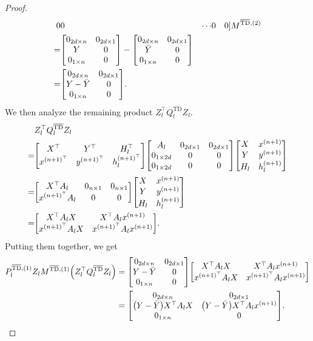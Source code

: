 \documentclass{article}
\newcommand{\bartd}{\overline{\text{TD}}}
\begin{document}
\begin{proof}
\begin{align}
                0 & 0 & \cdots & 0 & 0] M^{\bartd, (2)}\\
        =& \mqty[0_{2d\times n} & 0_{2d \times 1}\\
                 Y & 0\\
                 0_{1\times n} & 0] 
        - \mqty[0_{2d\times n} & 0_{2d \times 1}\\
                \bar{Y} & 0\\
                0_{1\times n} & 0]\\
        =& \mqty[0_{2d\times n} & 0_{2d \times 1}\\
                 Y - \bar{Y} & 0\\
                 0_{1\times n} & 0].
    \end{align}
    We then analyze the remaining product $Z_l^\top Q_l^{\bartd} Z_l$.
    \begin{align}
        & Z_l^\top Q_l^{\bartd} Z_l\\
        =& \mqty[X^\top & Y^\top & H_l^\top\\
                 x^{(n+1)^\top} & y^{(n+1)^\top} &  h_l^{(n+1)^\top}]
           \mqty[A_l & 0_{2d\times 1} & 0_{2d\times 1}\\
                  0_{1\times 2d} & 0 & 0\\
                  0_{1\times 2d} & 0 & 0]
           \mqty[X & x^{(n+1)}\\
                 Y & y^{(n+1)}\\
                 H_l & h_l^{(n+1)}]\\
        =& \mqty[X^\top A_l & 0_{n\times1} & 0_{n\times1}\\
                 x^{(n+1)^\top} A_l & 0 & 0]
           \mqty[X & x^{(n+1)}\\
                 Y & y^{(n+1)}\\
                 H_l & h_l^{(n+1)}]\\
        =& \mqty[X^\top A_l X & X^\top A_l x^{(n+1)}\\
                 x^{(n+1)^\top} A_l X & x^{(n+1)^\top} A_l x^{(n+1)}].
    \end{align}
    Putting them together, we get
    \begin{align}
        P_l^{\bartd, (1)} Z_l M^{\bartd, (1)} \qty(Z_l^\top Q_l^{\bartd} Z_l)
        &= \mqty[0_{2d\times n} & 0_{2d \times 1}\\
                 Y - \bar{Y} & 0\\
                 0_{1\times n} & 0]
            \mqty[X^\top A_l X & X^\top A_l x^{(n+1)}\\
                                 x^{(n+1)^\top} A_l X & x^{(n+1)^\top} A_l x^{(n+1)}]\\
        &= \mqty[0_{2d\times n} & 0_{2d \times 1}\\
                 \qty(Y - \bar{Y}) X^\top A_l X & \qty(Y - \bar{Y}) X^\top A_l x^{(n+1)}\\
                 0_{1\times n} & 0].
    \end{align}


\end{proof}
\end{document}
